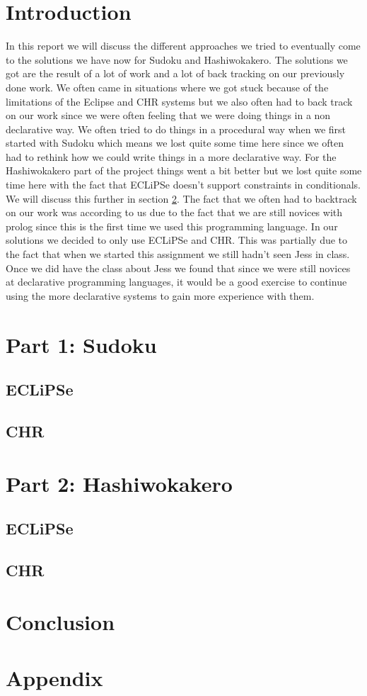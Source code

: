 \documentclass{report}
\begin{document}
\chapter*{Introduction}
In this report we will discuss the different approaches we tried to eventually come to the solutions we have now for Sudoku and Hashiwokakero. The solutions we got are the result of a lot of work and a lot of back tracking on our previously done work. We often came in situations where we got stuck because of the limitations of the Eclipse and CHR systems but we also often had to back track on our work since we were often feeling that we were doing things in a non declarative way. We often tried to do things in a procedural way when we first started with Sudoku which means we lost quite some time here since we often had to rethink how we could write things in a more declarative way. For the Hashiwokakero part of the project things went a bit better but we lost quite some time here with the fact that ECLiPSe doesn't support constraints in conditionals. We will discuss this further in section \ref{sec:Hashiwokakero}. The fact that we often had to backtrack on our work was according to us due to the fact that we are still novices with prolog since this is the first time we used this programming language.
	\newline
	\newline
	In our solutions we decided to only use ECLiPSe and CHR. This was partially due to the fact that when we started this assignment we still hadn't seen Jess in class. Once we did have the class about Jess we found that since we were still novices at declarative programming languages, it would be a good exercise to continue using the more declarative systems to gain more experience with them.
	
\chapter{Part 1: Sudoku}
\section{ECLiPSe}
\section{CHR}
\chapter{Part 2: Hashiwokakero}
\label{sec:Hashiwokakero}
\section{ECLiPSe}
\section{CHR}
\chapter{Conclusion}
\chapter{Appendix}
\end{document}
